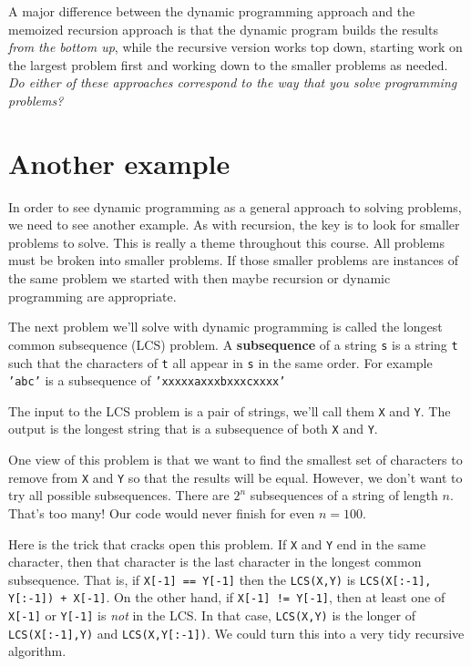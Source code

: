 A major difference between the dynamic programming approach and the memoized recursion approach is that the dynamic program builds the results \emph{from the bottom up}, while the recursive version works top down, starting work on the largest problem first and working down to the smaller problems as needed.
\emph{Do either of these approaches correspond to the way that you solve programming problems?}

\section{Another example}


In order to see dynamic programming as a general approach to solving problems, we need to see another example.
As with recursion, the key is to look for smaller problems to solve.
This is really a theme throughout this course.
All problems must be broken into smaller problems.
If those smaller problems are instances of the same problem we started with then maybe recursion or dynamic programming are appropriate.


The next problem we'll solve with dynamic programming is called the longest common subsequence (LCS) problem.
A \textbf{subsequence} of a string \texttt{s} is a string \texttt{t} such that the characters of \texttt{t} all appear in \texttt{s} in the same order.
For example \texttt{'abc'} is a subsequence of \texttt{'xxxxxaxxxbxxxcxxxx'}


The input to the LCS problem is a pair of strings, we'll call them \texttt{X} and \texttt{Y}.
The output is the longest string that is a subsequence of both \texttt{X} and \texttt{Y}.


One view of this problem is that we want to find the smallest set of characters to remove from \texttt{X} and \texttt{Y} so that the results will be equal.
However, we don't want to try all possible subsequences.
There are $2^n$ subsequences of a string of length $n$.
That's too many!
Our code would never finish for even $n = 100$.


Here is the trick that cracks open this problem.
If \texttt{X} and \texttt{Y} end in the same character, then that character is the last character in the longest common subsequence.
That is, if \texttt{X[-1] == Y[-1]} then the \texttt{LCS(X,Y)} is \texttt{LCS(X[:-1], Y[:-1]) + X[-1]}.
On the other hand, if \texttt{X[-1] != Y[-1]}, then at least one of \texttt{X[-1]} or \texttt{Y[-1]} is \emph{not} in the LCS.
In that case, \texttt{LCS(X,Y)} is the longer of \texttt{LCS(X[:-1],Y)} and \texttt{LCS(X,Y[:-1])}.
We could turn this into a very tidy recursive algorithm.

